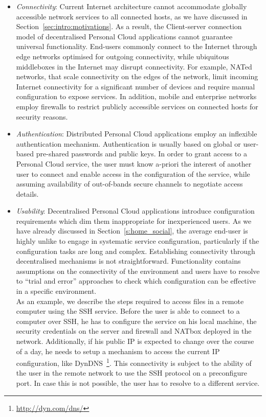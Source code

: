 \begin{itemize}
  \item {\it Connectivity}\/: Current Internet architecture cannot accommodate
    globally accessible network services to all connected hosts, as we have
    discussed in Section~\ref{sec:intro:motivations}. As a result, the
    Client-server connection model of decentralised Personal Cloud applications
    cannot guarantee universal functionality.  End-users commonly connect to
    the Internet through edge networks optimised for outgoing connectivity,
    while ubiquitous middleboxes in the Internet may disrupt connectivity. For
    example, NATed networks, that scale connectivity on the edges of the
    network, limit incoming Internet connectivity for a significant number of
    devices and require manual configuration to expose services. In addition,
    mobile and enterprise networks employ firewalls to restrict publicly
    accessible services on connected hosts for security reasons.
  \item {\it Authentication}\/: Distributed Personal Cloud applications employ
        an inflexible authentication mechanism. Authentication is usually based
        on global or user-based pre-shared passwords and public keys. In order
        to grant access to a Personal Cloud service, the user must know a-priori
        the interest of another user to connect and enable access in the
        configuration of the service, while assuming availability of out-of-bands
        secure channels to negotiate access details. 
  \item {\it Usability}\/: Decentralised Personal Cloud applications introduce 
    configuration requirements which dim them inappropriate for inexperienced
    users. As we have already discussed in Section~\ref{s:home_social},
    the average end-user is highly unlike to engage in systematic
    service configuration, particularly if the configuration tasks are long and
    complex. Establishing connectivity through decentralised mechanisms is
    not straightforward. Functionality contains
    assumptions on the connectivity of the environment and users have to
    resolve to ``trial and error'' approaches to check which configuration
    can be effective in a specific environment. \\ 
    As an example, we describe the steps required to access files in a remote
    computer using the SSH service. Before the user is able to connect to a
    computer over SSH, he has to configure the service on his local machine, the
    security credentials on the server and firewall and NATbox deployed in the
    network. Additionally, if his public IP is expected to change over the
    course of a day, he needs to setup a mechanism to access the current IP
    configuration, like DynDNS~\footnote{\url{http://dyn.com/dns/}}\@.  This
    connectivity is subject to the ability of the user in the remote network to
    use the SSH protocol on a preconfigure port.  In case this is not
    possible, the user has to resolve to a different service.   
\end{itemize}

